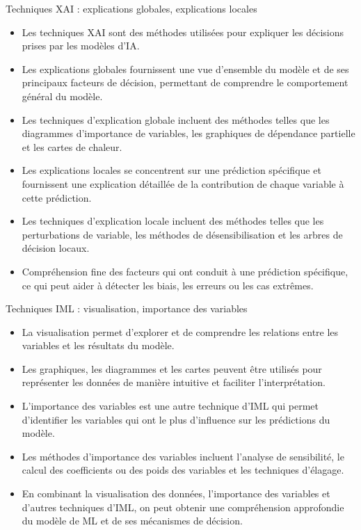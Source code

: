 \documentclass{beamer}
\begin{document}
\begin{frame}{Techniques XAI : explications globales, explications locales}
	\begin{itemize}
		\item Les techniques XAI sont des méthodes utilisées pour expliquer les décisions prises par les modèles d'IA.
		\item Les explications globales fournissent une vue d'ensemble du modèle et de ses principaux facteurs de décision, permettant de comprendre le comportement général du modèle.
		\item Les techniques d'explication globale incluent des méthodes telles que les diagrammes d'importance de variables, les graphiques de dépendance partielle et les cartes de chaleur.
	
		\item Les explications locales se concentrent sur une prédiction spécifique et fournissent une explication détaillée de la contribution de chaque variable à cette prédiction.
		\item Les techniques d'explication locale incluent des méthodes telles que les perturbations de variable, les méthodes de désensibilisation et les arbres de décision locaux.
		\item Compréhension fine des facteurs qui ont conduit à une prédiction spécifique, ce qui peut aider à détecter les biais, les erreurs ou les cas extrêmes.

	\end{itemize}
\end{frame}

\begin{frame}{Techniques IML : visualisation, importance des variables}
	\begin{itemize}
		\item La visualisation permet d'explorer et de comprendre les relations entre les variables et les résultats du modèle.
		\item Les graphiques, les diagrammes et les cartes peuvent être utilisés pour représenter les données de manière intuitive et faciliter l'interprétation.
		\item L'importance des variables est une autre technique d'IML qui permet d'identifier les variables qui ont le plus d'influence sur les prédictions du modèle.
		\item Les méthodes d'importance des variables incluent l'analyse de sensibilité, le calcul des coefficients ou des poids des variables et les techniques d'élagage.

		\item En combinant la visualisation des données, l'importance des variables et d'autres techniques d'IML, on peut obtenir une compréhension approfondie du modèle de ML et de ses mécanismes de décision.

	\end{itemize}
\end{frame}
\end{document}
